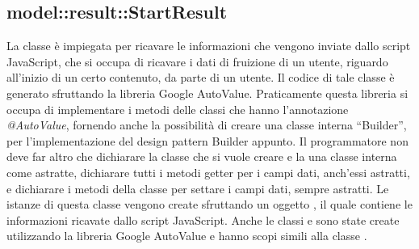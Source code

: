 \documentclass[../Tesi.tex]{subfiles}
\begin{document}
		\subsection{model::result::StartResult}
		La classe  è impiegata per ricavare le informazioni che vengono inviate dallo script JavaScript, che si occupa di ricavare i dati di fruizione di un utente, riguardo all'inizio di un certo contenuto, da parte di un utente. Il codice di tale classe è generato sfruttando la libreria Google AutoValue. Praticamente questa libreria si occupa di implementare i metodi delle classi che hanno l'annotazione \textit{@AutoValue}, fornendo anche la possibilità di creare una classe interna ``Builder'', per l'implementazione del design pattern Builder appunto. Il programmatore non deve far altro che dichiarare la classe che si vuole creare e la una classe interna  come astratte, dichiarare tutti i metodi getter per i campi dati, anch'essi astratti, e dichiarare i metodi della classe  per settare i campi dati, sempre astratti. Le istanze di questa classe vengono create sfruttando un oggetto , il quale contiene le informazioni ricavate dallo script JavaScript. Anche le classi  e  sono state create utilizzando la libreria Google AutoValue e hanno scopi simili alla classe .
\end{document}
